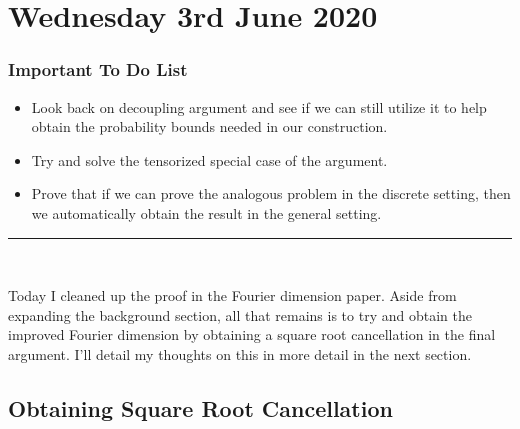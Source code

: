 \documentclass[openany,nobib,nols,a4paper,twoside,symmetric,justified,notoc]{tufte-book}
\theoremstyle{plain}
\theoremstyle{remark}
\theoremstyle{definition}
\newenvironment{importanttodo}%
    {\subsection{Important To Do List}}%
    {\vspace{2mm}\hrule\hspace{\stretch{1}}\\}
\begin{document}
\chapter{Wednesday 3rd June 2020} \label{03062020}

\begin{importanttodo}
    \begin{itemize}
        \item Look back on decoupling argument and see if we can still utilize it to help obtain the probability bounds needed in our construction.

        \item Try and solve the tensorized special case of the argument.

        \item Prove that if we can prove the analogous problem in the discrete setting, then we automatically obtain the result in the general setting.
    \end{itemize}
\end{importanttodo}

Today I cleaned up the proof in the Fourier dimension paper. Aside from expanding the background section, all that remains is to try and obtain the improved Fourier dimension by obtaining a square root cancellation in the final argument. I'll detail my thoughts on this in more detail in the next section.

\section{Obtaining Square Root Cancellation}
\end{document}
